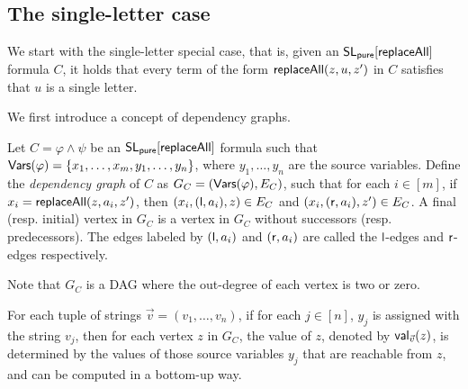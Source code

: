 \documentclass{llncs}
\begin{document}
\subsection{The single-letter case}

We start with the single-letter special case, that is, given an $\mathsf{SL_{pure}}[\mathsf{replaceAll}]$ formula $C$, it holds that every term of the form $\mathsf{replaceAll}(z, u, z')$ in $C$ satisfies that $u$ is a single letter.

We first introduce a concept of dependency graphs.

\begin{definition}
Let $C= \varphi \wedge \psi$ be an $\mathsf{SL_{pure}}[\mathsf{replaceAll}]$ formula such that $\mathsf{Vars}(\varphi) = \{x_1,\dots, x_m, y_1, \dots, y_n\}$, where $y_1,\dots, y_n$ are the source variables. Define the \emph{dependency graph} of $C$ as $G_C= (\mathsf{Vars}(\varphi), E_C)$, such that for each $i \in [m]$, if $x_i = \mathsf{replaceAll}(z, a_i, z')$, then $(x_i, (\mathsf{l}, a_i), z) \in E_C$ and $(x_i, (\mathsf{r}, a_i), z') \in E_C$. A final (resp. initial) vertex in $G_C$ is a vertex in $G_C$ without successors (resp. predecessors). The edges labeled by $(\mathsf{l},a_i)$ and $(\mathsf{r}, a_i)$ are called the $\mathsf{l}$-edges and $\mathsf{r}$-edges respectively. 
\end{definition}
Note that $G_C$ is a DAG where the out-degree of each vertex is two or zero. 


For each tuple of strings $\vec{v}=(v_1,\dots, v_n)$, if for each $j \in [n]$, $y_j$ is assigned with the string $v_j$, then for each vertex $z$ in $G_C$, the value of $z$, denoted by $\mathsf{val}_{\vec{v}}(z)$, is determined by the values of those source variables $y_j$ that are reachable from $z$, and can be computed in a bottom-up way. 

\smallskip
\end{document}
